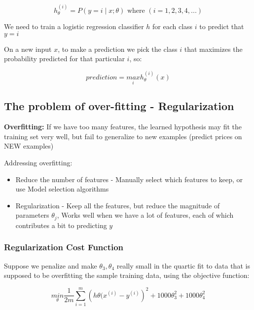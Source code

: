 \documentclass{article}
\begin{document}
\begin{equation}
    h_{\theta}^{(i)} = P \left(y=i \mid x; \theta \right) \text{ where } (i= 1,2,3,4,...)
\end{equation}


We need to train a logistic regression classifier $h$ for each class $i$ to predict that $y=i$

On a new input $x$, to make a prediction we pick the class $i$ that maximizes the probability predicted for that particular $i$, so:

\begin{equation}
    prediction = \underset{i}{max}  h_{\theta}^{(i)} (x)
\end{equation}




\subsection{The problem of over-fitting - Regularization}

\textbf{Overfitting:} If we have too many features, the learned hypothesis may fit the training set very well, but fail to generalize to new examples (predict prices on NEW examples)



Addressing overfitting:
\begin{itemize}
    \item Reduce the number of features - Manually select which features to keep, or use Model selection algorithms
    \item Regularization - Keep all the features, but reduce the magnitude of parameters $\theta_j$, Works well when we have a lot of features, each of which contributes a bit to predicting $y$
\end{itemize}


\subsubsection{Regularization Cost Function}

Suppose we penalize and make $\theta_3, \theta_4$ really small in the quartic fit to data that is supposed to be overfitting the sample training data, using the objective function:

\begin{equation}
    \underset{\theta}{min} \frac{1}{2m} \sum_{i=1}^{m} \left(h\theta (x^{(i)} - y^{(i)} \right)^2 + 1000 \theta_3^2 + 1000 \theta_4^2
\end{equation}
\end{document}
